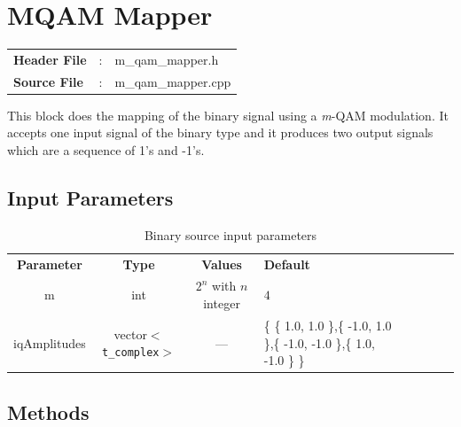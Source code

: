 \clearpage

\section{MQAM Mapper}

\begin{tcolorbox}	
	\begin{tabular}{p{2.75cm} p{0.2cm} p{10.5cm}} 	
		\textbf{Header File}   &:& m\_qam\_mapper.h \\
		\textbf{Source File}   &:& m\_qam\_mapper.cpp \\
	\end{tabular}
\end{tcolorbox}

This block does the mapping of the binary signal using a \textit{m}-QAM modulation. It accepts one input signal of the binary type and it produces two output signals which are a sequence of 1's and -1's.

\subsection*{Input Parameters}

\begin{table}[h]
	\centering
	\begin{tabular}{|c|c|c|p{50mm}|cccp{50mm}}
		\cline{1-4}
		\textbf{Parameter} & \textbf{Type} & \textbf{Values} &   \textbf{Default}& \\ \cline{1-4}
		m & int & $2^n$ with $n$ integer & $4$ \\ \cline{1-4}
		iqAmplitudes & vector$<$\texttt{t\_complex}$>$ & \---- & \{ \{ 1.0, 1.0 \},\{ -1.0, 1.0 \},\{ -1.0, -1.0 \},\{ 1.0, -1.0 \} \} \\ \cline{1-4}
	\end{tabular}
	\caption{Binary source input parameters}
	\label{table:mapper_in_par}
\end{table}

%	

\subsection*{Methods}

